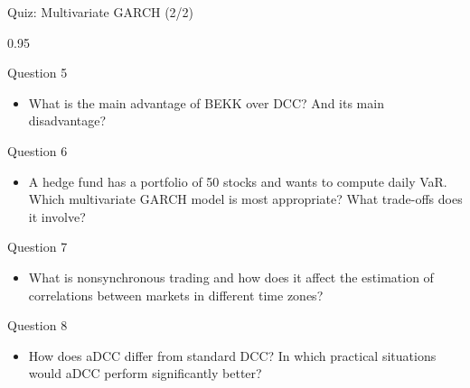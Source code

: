 \documentclass[9pt, aspectratio=169, t]{beamer}
\begin{document}
\begin{frame}{Quiz: Multivariate GARCH (2/2)}
    \begin{cminipage}{0.95\textwidth}
    \vspace{-2mm}
    {\scriptsize
    \begin{block}{Question 5}
        \begin{itemize}\setlength{\itemsep}{0pt}
            \item What is the main advantage of BEKK over DCC? And its main disadvantage?
        \end{itemize}
    \end{block}
    \vspace{-2mm}
    \begin{block}{Question 6}
        \begin{itemize}\setlength{\itemsep}{0pt}
            \item A hedge fund has a portfolio of 50 stocks and wants to compute daily VaR. Which multivariate GARCH model is most appropriate? What trade-offs does it involve?
        \end{itemize}
    \end{block}
    \vspace{-2mm}
    \begin{block}{Question 7}
        \begin{itemize}\setlength{\itemsep}{0pt}
            \item What is nonsynchronous trading and how does it affect the estimation of correlations between markets in different time zones?
        \end{itemize}
    \end{block}
    \vspace{-2mm}
    \begin{block}{Question 8}
        \begin{itemize}\setlength{\itemsep}{0pt}
            \item How does aDCC differ from standard DCC? In which practical situations would aDCC perform significantly better?
        \end{itemize}
    \end{block}
    }
    \end{cminipage}
\end{frame}
\end{document}
